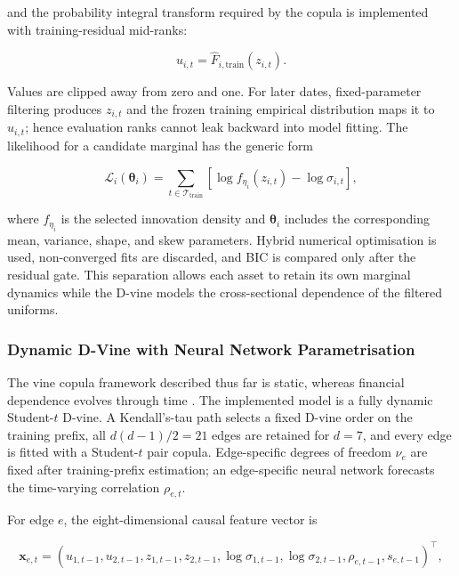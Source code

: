 and the probability integral transform required by the copula is implemented with training-residual mid-ranks:

\begin{equation}
u_{i,t}=\widehat F_{i,\mathrm{train}}(z_{i,t}).
\label{eq:pit}
\end{equation}

Values are clipped away from zero and one. For later dates, fixed-parameter filtering produces $z_{i,t}$ and the frozen training empirical distribution maps it to $u_{i,t}$; hence evaluation ranks cannot leak backward into model fitting. The likelihood for a candidate marginal has the generic form

\begin{equation}
\mathcal{L}_i(\boldsymbol\theta_i)=\sum_{t\in\mathcal T_{\mathrm{train}}}
\left[\log f_{\eta_i}(z_{i,t})-\log\sigma_{i,t}\right],
\label{eq:garch_likelihood}
\end{equation}

where $f_{\eta_i}$ is the selected innovation density and $\boldsymbol\theta_i$ includes the corresponding mean, variance, shape, and skew parameters. Hybrid numerical optimisation is used, non-converged fits are discarded, and BIC is compared only after the residual gate. This separation allows each asset to retain its own marginal dynamics while the D-vine models the cross-sectional dependence of the filtered uniforms.

\subsubsection{Dynamic D-Vine with Neural Network Parametrisation}
\label{subsubsec:3_dynamic_vine_with_NN_param}

The vine copula framework described thus far is static, whereas financial dependence evolves through time \cite{so_vine-copula_2014}. The implemented model is a fully dynamic Student-$t$ D-vine. A Kendall's-tau path selects a fixed D-vine order on the training prefix, all $d(d-1)/2=21$ edges are retained for $d=7$, and every edge is fitted with a Student-$t$ pair copula. Edge-specific degrees of freedom $\nu_e$ are fixed after training-prefix estimation; an edge-specific neural network forecasts the time-varying correlation $\rho_{e,t}$.

For edge $e$, the eight-dimensional causal feature vector is

\begin{equation}
\boldsymbol x_{e,t}=\left(u_{1,t-1},u_{2,t-1},z_{1,t-1},z_{2,t-1},
\log\sigma_{1,t-1},\log\sigma_{2,t-1},\rho_{e,t-1},s_{e,t-1}\right)^{\top},
\label{eq:tau_evolution}
\end{equation}

